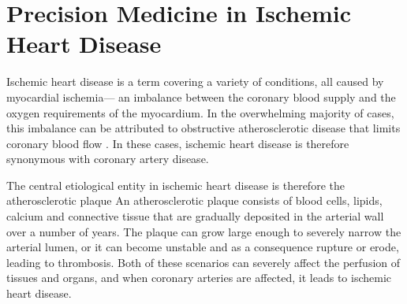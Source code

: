 \chapter{Precision Medicine in Ischemic Heart Disease}
\label{chap:precision-medicine}

Ischemic heart disease is a term covering a variety of conditions, 
all caused by myocardial ischemia---%
an imbalance between the coronary blood supply and the 
oxygen requirements of the myocardium.
In the overwhelming majority of cases, 
this imbalance can be attributed to obstructive atherosclerotic disease 
that limits coronary blood flow
.
In these cases, ischemic heart disease is therefore synonymous 
with coronary artery disease.

The central etiological entity in ischemic heart disease
is therefore the atherosclerotic plaque
An atherosclerotic plaque consists of blood cells, lipids, calcium 
and connective tissue that are gradually deposited in the arterial wall 
over a number of years.
The plaque can grow large enough to severely narrow the arterial lumen,
or it can become unstable and as a consequence rupture or erode,
leading to thrombosis.%
Both of these scenarios can severely affect 
the perfusion of tissues and organs, 
and when coronary arteries are affected,
it leads to ischemic heart disease.

